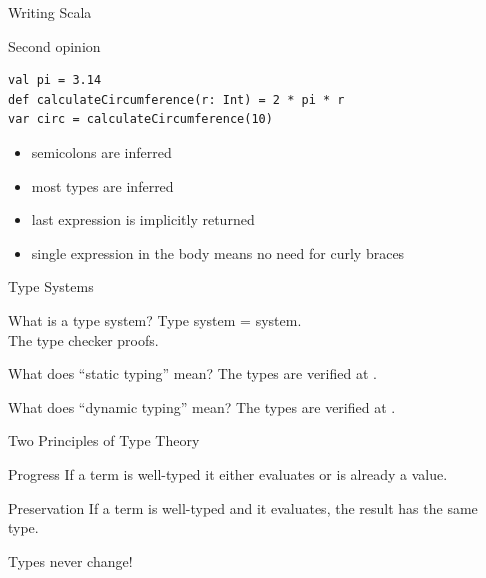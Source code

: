 \begin{frame}[fragile]{Writing Scala}
\begin{exampleblock}{Second opinion}
\begin{lstlisting}
val pi = 3.14
def calculateCircumference(r: Int) = 2 * pi * r
var circ = calculateCircumference(10)
\end{lstlisting}
\end{exampleblock}
\pause
\begin{itemize}
  \item semicolons are inferred
  \item most types are inferred
  \item last expression is implicitly returned
  \item single expression in the body means no need for curly braces
\end{itemize}
\end{frame}

\begin{frame}{Type Systems}
\begin{block}{What is a type system?}
\pause
Type system =  system.\\
The type checker  proofs.
\end{block}
\pause
\begin{block}{What does ``static typing'' mean?}
\pause
The types are verified at .
\end{block}
\pause
\begin{block}{What does ``dynamic typing'' mean?}
\pause
The types are verified at .
\end{block}
\end{frame}

\begin{frame}{Two Principles of Type Theory}
\begin{block}{Progress}
If a term is well-typed it either evaluates or is already a value.
\end{block}
\pause
{}
\pause
\begin{block}{Preservation}
If a term is well-typed and it evaluates, the result has the same type.
\end{block}
\begin{center}
\pause
Types \alert{never} change!
\end{center}
\end{frame}

